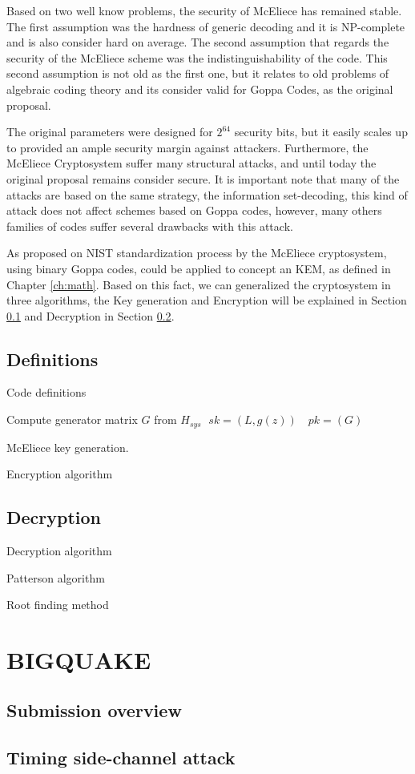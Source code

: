 Based on two well know problems, the security of McEliece has remained stable. The first assumption was the hardness of generic decoding and it is NP-complete and is also consider hard on average. The second assumption that regards the security of the McEliece scheme was the indistinguishability of the code. This second assumption is not old as the first one, but it relates to old problems of algebraic coding theory and its consider valid for Goppa Codes, as the original proposal. 

The original parameters were designed for $2^{64}$ security bits, but it easily scales up to provided an ample security margin against attackers. Furthermore, the McEliece Cryptosystem suffer many structural attacks, and until today the original proposal remains consider secure. It is important note that many of the attacks are based on the same strategy, the information set-decoding, this kind of attack does not affect schemes based on Goppa codes, however, many others families of codes suffer several drawbacks with this attack. 

As proposed on NIST standardization process by \cite{bernstein2017classic, bardet2017big} the McEliece cryptosystem, using binary Goppa codes, could be applied to concept an KEM, as defined in Chapter \ref{ch:math}. Based on this fact, we can generalized the cryptosystem in three algorithms, the Key generation and Encryption will be explained in Section \ref{sub:mc-def} and Decryption in Section \ref{sub:mc-dec}.

\subsection{Definitions}
\label{sub:mc-def}
Code definitions

\begin{algorithm}[!ht]
 Compute generator matrix $G$ from $H_{sys}$\;
 \Return $\;sk = (L, g(z)) \quad pk = (G)$\;

 \caption{McEliece key generation.}
 \label{alg:1}
\end{algorithm}

Encryption algorithm

\subsection{Decryption}
\label{sub:mc-dec}
Decryption algorithm

Patterson algorithm

Root finding method


\section{BIGQUAKE}
\subsection{Submission overview}
\subsection{Timing side-channel attack}